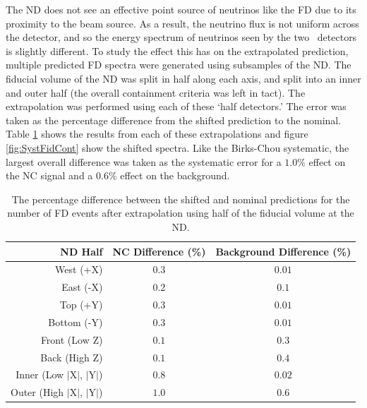 The ND does not see an effective point source of neutrinos like the FD due to its proximity to the beam source. As a result, the neutrino flux is not uniform across the detector, and so the energy spectrum of neutrinos seen by the two \nova~detectors is slightly different. To study the effect this has on the extrapolated prediction, multiple predicted FD spectra were generated using subsamples of the ND. The fiducial volume of the ND was split in half along each axis, and split into an inner and outer half (the overall containment criteria was left in tact). The extrapolation was performed using each of these `half detectors.' The error was taken as the percentage difference from the shifted prediction to the nominal. Table \ref{tab:SystFidCont} shows the results from each of these extrapolations and figure \ref{fig:SystFidCont} show the shifted spectra. Like the Birks-Chou systematic, the largest overall difference was taken as the systematic error for a $1.0\%$ effect on the NC signal and a $0.6\%$ effect on the background.
\begin{table}[htb]
  \begin{center}
    \caption[ND Containment Systematic Errors]{The percentage difference between the shifted and nominal predictions for the number of FD events after extrapolation using half of the fiducial volume at the ND.}
    \label{tab:SystFidCont}
    \begin{tabular}{r c c}
      \hline\hline
      ND Half & NC Difference (\%) & Background Difference (\%) \\
      \hline
      West (+X) & $0.3$ & $0.01$ \\
      East (-X) & $0.2$ & $0.1$ \\
      Top (+Y) & $0.3$ & $0.01$ \\
      Bottom (-Y) & $0.3$ & $0.01$ \\
      Front (Low Z) & $0.1$ & $0.3$ \\
      Back (High Z) & $0.1$ & $0.4$ \\
      Inner (Low $\vert$X$\vert$, $\vert$Y$\vert$) & $0.8$ & $0.02$ \\
      Outer (High $\vert$X$\vert$, $\vert$Y$\vert$) & $1.0$ & $0.6$ \\
      \hline
    \end{tabular}
  \end{center}
\end{table}

